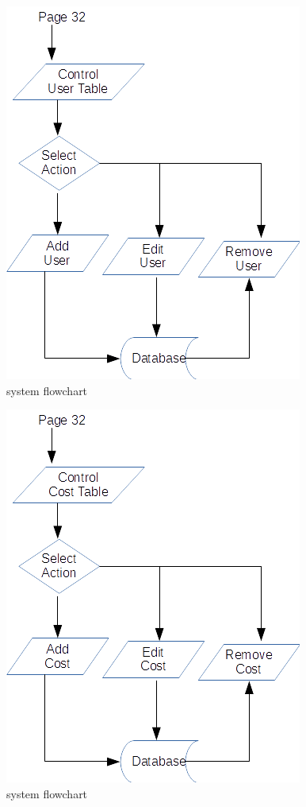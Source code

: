 \begin{figure}[H]
\includegraphics{./design/flowchart 4.png}
\caption{system flowchart}
\end{figure}

\begin{figure}[H]
\includegraphics{./design/flowchart 5.png}
\caption{system flowchart}
\end{figure}

